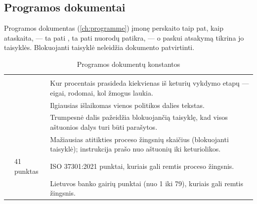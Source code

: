 \subsection{Programos dokumentai}\label{sec:config:programme}

Programos dokumentas (\cref{ch:programme}) įmonę perskaito taip pat, kaip ataskaita, --- ta pati
, ta pati nuorodų patikra, --- o paskui atsakymą tikrina jo
taisyklės. Blokuojanti taisyklė neleidžia dokumento patvirtinti.

\begin{xltabular}{\textwidth}{@{}L{44mm}L{19mm}Y@{}}
\caption{Programos dokumentų konstantos}\label{tab:config:programme}\\
\toprule
{} &  &  \\
\midrule
\endfirsthead
\toprule
{} &  &  \\
\midrule
\endhead
\bottomrule
\endlastfoot
{} &  & Kur procentais prasideda kiekvienas iš keturių vykdymo etapų --- eigai, rodomai, kol žmogus laukia. \\
 &  & Ilgiausias išlaikomas vienos politikos dalies tekstas. \\
 &  & Trumpesnė dalis pažeidžia blokuojančią taisyklę, kad visos aštuonios dalys turi būti parašytos. \\
 &  & Mažiausias atitikties proceso žingsnių skaičius (blokuojanti taisyklė); instrukcija prašo nuo aštuonių iki keturiolikos. \\
 & 41 punktas & ISO 37301:2021 punktai, kuriais gali remtis proceso žingsnis. \\
 &  & Lietuvos banko gairių punktai (nuo 1 iki 79), kuriais gali remtis žingsnis. \\

\end{xltabular}
